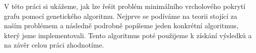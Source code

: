 V této práci si ukážeme, jak lze řešit problém minimálního vrcholového pokrytí grafu pomocí genetického algoritmu. Nejprve se podíváme na teorii stojící za naším problémem a následně podrobně popíšeme jeden konkrétní algoritmus, který jsme implementovali. Tento algoritmus poté použijeme k získání výsledků a na závěr celou práci zhodnotíme.
